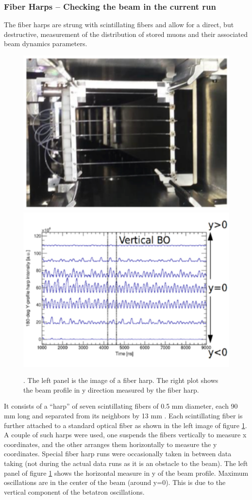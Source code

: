 \documentclass[journal,article,submit,moreauthors,pdftex,10pt,a4paper]{Definitions/mdpi}
\begin{document}
\subsubsection{Fiber Harps – Checking the beam in the current run}
The fiber harps are strung
with scintillating fibers and allow for a direct, but destructive, measurement of the
distribution of stored muons and their associated beam dynamics parameters. 
\begin{figure}[H]
\centering
\includegraphics[width=6 cm]{harp.pdf}
\includegraphics[width=7 cm]{vert_cbo.pdf}
\caption{\label{fig4}. The left panel is the image of a fiber harp. The right plot shows the beam 
profile in y direction measured by the fiber harp.}
\end{figure}  
It consists of a “harp” of seven scintillating fibers of 0.5 mm diameter,
each 90 mm long and separated from its neighbors by 13 mm \cite{TDR}. 
Each scintillating fiber is further attached to a standard optical fiber as 
shown in the left image of figure \ref{fig4}. A couple of such harps were used, one suspends
the fibers vertically to measure x coordinates, and the other arranges them horizontally to measure
the y coordinates. Special fiber harp runs were occasionally taken in between data taking
(not during the actual data runs as it is an obstacle to the beam).
The left panel of figure \ref{fig4} shows the horizontal measure in y of the beam profile. 
Maximum oscillations are in the center of the beam (around y=0). This is due to 
the vertical component of the betatron oscillations. 
\end{document}
